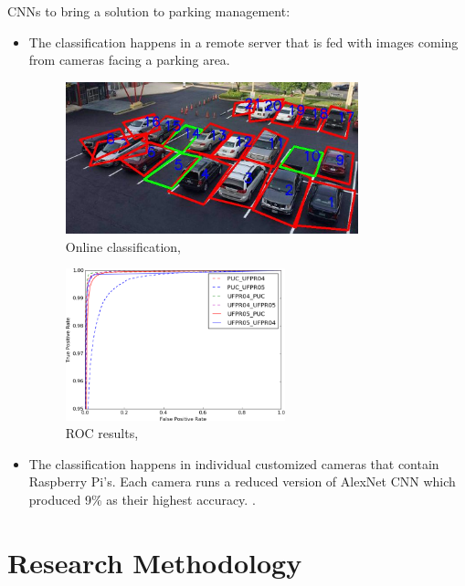 \documentclass{beamer}
\begin{document}
\begin{frame}[allowframebreaks]
CNNs to bring a solution to parking management:

\begin{itemize}
	\item The classification happens in a remote server that is fed with images coming from cameras facing a parking area. 
	\begin{figure}[h!]
		\centering
		\includegraphics[width=0.8\textwidth]{Pictures/stall}
		\caption{Online classification, \cite{7845408}}
	\end{figure} 
	
	\begin{figure}[h!]
		\centering
		\includegraphics[width=0.6\textwidth]{Pictures/roc-auc}
		\caption{ROC results, \cite{7845408}}
	\end{figure}

\item The classification happens in individual customized cameras that contain Raspberry Pi's. Each camera runs a reduced version of AlexNet CNN which produced 9\% as their highest accuracy. \cite{Amato2017327}.
	 
\end{itemize}


\end{frame}

\section{Research Methodology}
\end{document}
